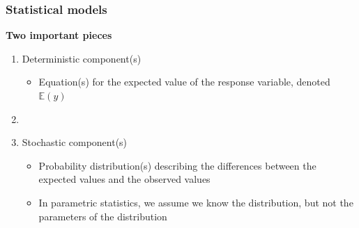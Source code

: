 \documentclass[color=usenames,dvipsnames]{beamer}\usepackage[]{graphicx}\usepackage[]{color}
\begin{document}
\begin{frame}
  \frametitle{Statistical models}
  {\bf \large Two important pieces \par}
  \large
  \begin{enumerate}
    \large
    \item<1-> Deterministic component(s)
      \begin{itemize}
        \large
        \item Equation(s) for the expected value of the response
          variable, denoted $\mathbb{E}(y)$
      \end{itemize}
    \item[]
    \item<2-> Stochastic component(s)
      \begin{itemize}
        \large
        \item Probability distribution(s) describing the differences
          between the expected values and the observed values
        \item In parametric statistics, we assume we know the
          distribution, but not the parameters of the distribution
      \end{itemize}
  \end{enumerate}
\end{frame}




\end{document}
